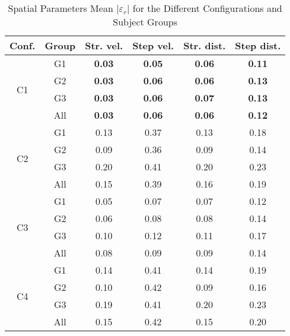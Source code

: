\begin{table}[t]
	\centering
	\caption{Spatial Parameters Mean $|\varepsilon_r|$ for the Different Configurations and Subject Groups}
	\label{tab:mean_error_dist}
	\begin{tabular}{@{}cccccc@{}}
		\hline
		Conf.               & Group & Str. vel.     & Step vel.     & Str. dist.    & Step dist.    \\ \hline
\multirow{4}{*}{C1} & G1    & \textbf{0.03} & \textbf{0.05} & \textbf{0.06} & \textbf{0.11} \\
                    & G2    & \textbf{0.03} & \textbf{0.06} & \textbf{0.06} & \textbf{0.13} \\
                    & G3    & \textbf{0.03} & \textbf{0.06} & \textbf{0.07} & \textbf{0.13} \\
                    & All & \textbf{0.03} & \textbf{0.06} & \textbf{0.06} & \textbf{0.12} \\ \hline
\multirow{4}{*}{C2} & G1    & 0.13          & 0.37          & 0.13          & 0.18          \\
                    & G2    & 0.09          & 0.36          & 0.09          & 0.14          \\
                    & G3    & 0.20          & 0.41          & 0.20          & 0.23          \\
                    & All & 0.15          & 0.39          & 0.16          & 0.19          \\ \hline
\multirow{4}{*}{C3} & G1    & 0.05          & 0.07          & 0.07          & 0.12          \\
                    & G2    & 0.06          & 0.08          & 0.08          & 0.14          \\
                    & G3    & 0.10          & 0.12          & 0.11          & 0.17          \\
                    & All & 0.08          & 0.09          & 0.09          & 0.14          \\ \hline
\multirow{4}{*}{C4} & G1    & 0.14          & 0.41          & 0.14          & 0.19          \\
                    & G2    & 0.10          & 0.42          & 0.09          & 0.16          \\
                    & G3    & 0.19          & 0.41          & 0.20          & 0.23          \\
                    & All & 0.15          & 0.42          & 0.15          & 0.20          \\ \hline
	\end{tabular}
\end{table}